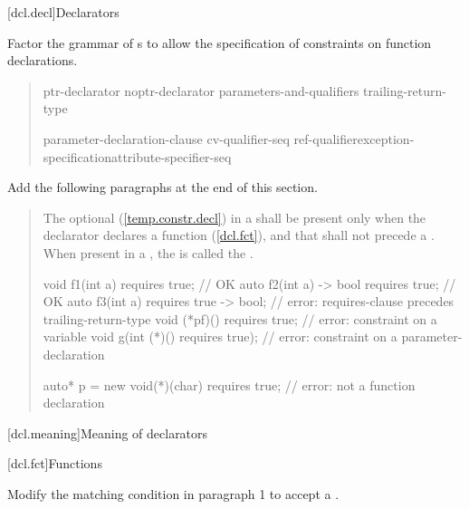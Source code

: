 
[dcl.decl]{Declarators}

Factor the grammar of s to
allow the specification of constraints on function declarations.

\begin{quote}
\setcounter{Paras}{3}


\begin{bnf}
\br
    ptr-declarator\br
    noptr-declarator parameters-and-qualifiers trailing-return-type 


\br
  \terminal{(} parameter-declaration-clause \terminal{)} cv-qualifier-seq\opt\br
    \hspace*{\bnfindentinc}ref-qualifier\opt exception-specification\opt attribute-specifier-seq\opt {}\opt
\end{bnf}
\end{quote}


Add the following paragraphs at the end of this section.

\begin{quote}
\pnum
The optional  (\ref{temp.constr.decl}) in a 
 shall be present only when the declarator declares a 
function (\ref{dcl.fct}), and that  shall not 
precede a . 
% 
When present in a , the  
is called the .
% 
\enterexample
\begin{codeblock}
void f1(int a) requires true;         // OK
auto f2(int a) -> bool requires true; // OK
auto f3(int a) requires true -> bool; // error: requires-clause precedes trailing-return-type
void (*pf)() requires true;           // error: constraint on a variable
void g(int (*)() requires true);      // error: constraint on a parameter-declaration
  
auto* p = new void(*)(char) requires true; // error: not a function declaration
\end{codeblock}
\exitexample
\end{quote}


\setcounter{section}{2}
[dcl.meaning]{Meaning of declarators}


\setcounter{subsection}{4}
[dcl.fct]{Functions}

Modify the matching condition in paragraph 1 to accept a 
.
      
